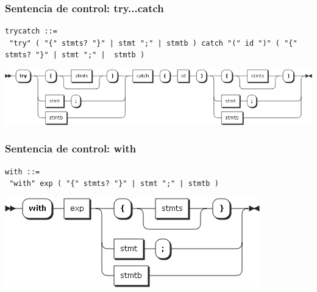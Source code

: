 \subsubsection{Sentencia de control: try...catch}

\begin{lstlisting}[style=nonumbers,basicstyle=\tiny]
trycatch ::= 
 "try" ( "{" stmts? "}" | stmt ";" | stmtb ) catch "(" id ")" ( "{" stmts? "}" | stmt ";" |  stmtb )
\end{lstlisting}  	
\begin{center}
\includegraphics[scale=0.4]{diagram/trycatch.png} \\
\end{center}

\pagebreak
\subsubsection{Sentencia de control: with}
\begin{multicols}{2}
\begin{lstlisting}[style=nonumbers,basicstyle=\tiny]
with ::= 
 "with" exp ( "{" stmts? "}" | stmt ";" | stmtb )
\end{lstlisting}  	
\columnbreak
\begin{center}
\includegraphics[scale=0.4]{diagram/with.png} \\
\end{center}
\end{multicols}


